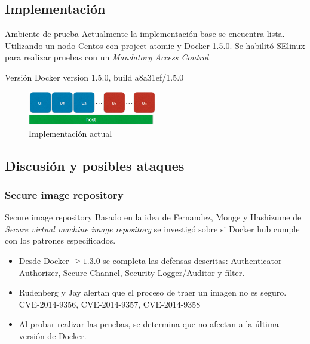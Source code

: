 \documentclass{bredelebeamer}
\begin{document}
\subsection{Implementación}


\begin{frame}{Ambiente de prueba}
	Actualmente la implementación base se encuentra lista. Utilizando un nodo
Centos con project-atomic y Docker 1.5.0. Se habilitó SElinux para
realizar pruebas con un \textit{Mandatory Access Control}

\begin{block}{Versión}
	Docker version 1.5.0, build a8a31ef/1.5.0

\end{block}


	\begin{figure}[H]
  \centering
  \includegraphics[width=0.5\textwidth]{images/prueba.png}
    \caption{Implementación actual}
    \label{fig:dynamic}
\end{figure}	
\end{frame}


\subsection{Discusión y posibles ataques}

\subsubsection{Secure image repository}
\begin{frame}{Secure image repository}
Basado en la idea de Fernandez, Monge y Hashizume  de \textit{Secure
virtual machine image repository} \cite{fernandez_monge:2015} se investigó sobre si Docker hub cumple con los patrones especificados.
 \begin{itemize}
 	\item Desde Docker \(\geq 1.3.0\) se completa las defensas descritas:  Authenticator-Authorizer, Secure Channel, Security Logger/Auditor y filter.
 	\item Rudenberg \cite{rudenberg:2015:Online} y Jay \cite{jay:2014:Online} alertan que el proceso de traer un imagen no es seguro. CVE-2014-9356, CVE-2014-9357, CVE-2014-9358 \cite{lvm-cve:2014:Online}
	\item Al probar realizar las pruebas, se determina que no afectan a la última versión de Docker.
 	
 \end{itemize}

	  
\end{frame}
\end{document}
